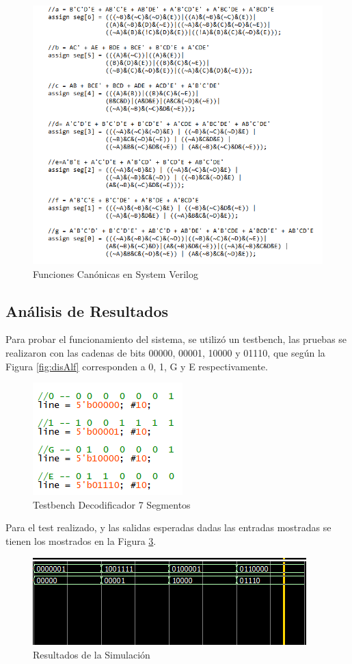 \documentclass[journal]{IEEEtran}
\begin{document}
	\begin{figure}[htb]
		\centering
		\includegraphics[scale = 0.5]{img/p1/funC1_SV.png}
		\caption{Funciones Canónicas en System Verilog}
		\label{fig:funCSV}
	\end{figure}
	
	\subsection{Análisis de Resultados}
	
	Para probar el funcionamiento del sistema, se utilizó un testbench, las pruebas se realizaron con las cadenas de bits 00000, 00001, 10000 y 01110, que según la Figura \ref{fig:disAlf} corresponden a 0, 1, G y E respectivamente. 
	\begin{figure}[htb]
		\centering
		\includegraphics[scale = 0.8]{img/p1/tb1.png}
		\caption{Testbench Decodificador 7 Segmentos}
		\label{fig:tb1}
	\end{figure}
	
	Para el test realizado, y las salidas esperadas dadas las entradas mostradas se tienen los mostrados en la Figura \ref{fig:tb2}. 
	\begin{figure}[htb]
		\centering
		\includegraphics[scale = 0.8]{img/p1/tb2.png}
		\caption{Resultados de la Simulación}
		\label{fig:tb2}
	\end{figure}
	
\end{document}
